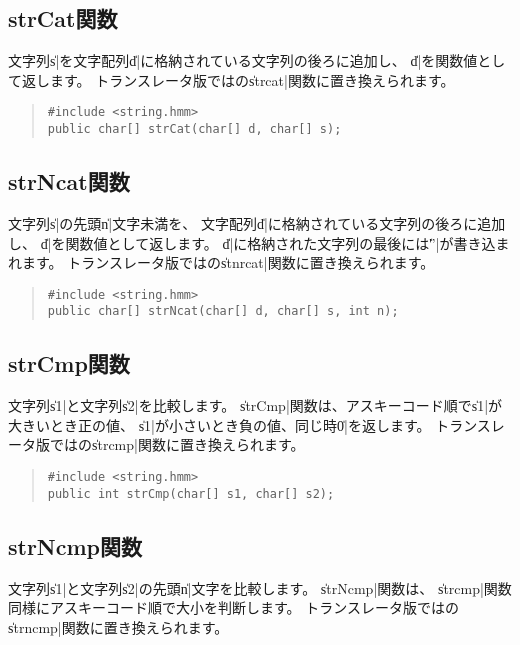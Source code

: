 \subsection{strCat関数}

文字列\|s|を文字配列\|d|に格納されている文字列の後ろに追加し、
\|d|を関数値として返します。
トランスレータ版では\cl の\|strcat|関数に置き換えられます。

\begin{quote}
\begin{verbatim}
#include <string.hmm>
public char[] strCat(char[] d, char[] s);
\end{verbatim}
\end{quote}

\subsection{strNcat関数}

文字列\|s|の先頭\|n|文字未満を、
文字配列\|d|に格納されている文字列の後ろに追加し、
\|d|を関数値として返します。
\|d|に格納された文字列の最後には\|'\0'|が書き込まれます。
トランスレータ版では\cl の\|stnrcat|関数に置き換えられます。

\begin{quote}
\begin{verbatim}
#include <string.hmm>
public char[] strNcat(char[] d, char[] s, int n);
\end{verbatim}
\end{quote}

\subsection{strCmp関数}

文字列\|s1|と文字列\|s2|を比較します。
\|strCmp|関数は、アスキーコード順で\|s1|が大きいとき正の値、
\|s1|が小さいとき負の値、同じ時\|0|を返します。
トランスレータ版では\cl の\|strcmp|関数に置き換えられます。

\begin{quote}
\begin{verbatim}
#include <string.hmm>
public int strCmp(char[] s1, char[] s2);
\end{verbatim}
\end{quote}

\subsection{strNcmp関数}

文字列\|s1|と文字列\|s2|の先頭\|n|文字を比較します。
\|strNcmp|関数は、
\|strcmp|関数同様にアスキーコード順で大小を判断します。
トランスレータ版では\cl の\|strncmp|関数に置き換えられます。

